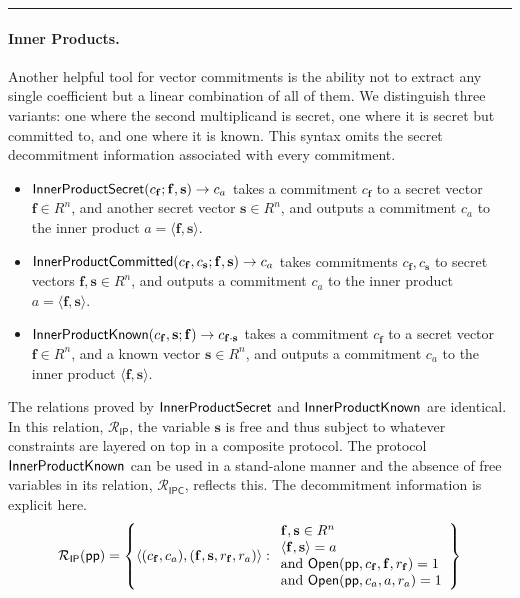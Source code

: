 \documentclass{article}
\theoremstyle{definition}
\begin{document}
\fi 

\noindent\rule{\textwidth}{0.4pt}

\paragraph{Inner Products.} Another helpful tool for vector commitments is the ability not to extract any single coefficient but a linear combination of all of them. We distinguish three variants: one where the second multiplicand is secret, one where it is secret but committed to, and one where it is known. This syntax omits the secret decommitment information associated with every commitment.
\begin{itemize}
    \item $\textsf{{InnerProductSecret}}(c_\mathbf{f}; \mathbf{f}, \mathbf{s}) \rightarrow c_{a}$ takes a commitment $c_\mathbf{f}$ to a secret vector $\mathbf{f} \in R^n$, and another secret vector $\mathbf{s} \in R^n$, and outputs a commitment $c_{a}$ to the inner product $a = \langle \mathbf{f}, \mathbf{s} \rangle$.
    \item $\textsf{{InnerProductCommitted}}(c_\mathbf{f}, c_\mathbf{s}; \mathbf{f}, \mathbf{s}) \rightarrow c_{a}$ takes commitments $c_\mathbf{f}, c_{\mathbf{s}}$ to secret vectors $\mathbf{f}, \mathbf{s} \in R^n$, and outputs a commitment $c_{a}$ to the inner product $a = \langle \mathbf{f}, \mathbf{s} \rangle$.
    \item $\textsf{{InnerProductKnown}}(c_\mathbf{f}, \mathbf{s}; \mathbf{f}) \rightarrow c_{\mathbf{f}\cdot{}\mathbf{s}}$ takes a commitment $c_\mathbf{f}$ to a secret vector $\mathbf{f} \in R^n$, and a known vector $\mathbf{s} \in R^n$, and outputs a commitment $c_{a}$ to the inner product $\langle \mathbf{f}, \mathbf{s} \rangle$.
\end{itemize}
The relations proved by $\textsf{{InnerProductSecret}}$ and $\textsf{{InnerProductKnown}}$ are identical. In this relation, $\mathcal{R}_\mathsf{IP}$, the variable $\mathbf{s}$ is free and thus subject to whatever constraints are layered on top in a composite protocol. The protocol $\textsf{{InnerProductKnown}}$ can be used in a stand-alone manner and the absence of free variables in its relation, $\mathcal{R}_\mathsf{IPC}$, reflects this. The decommitment information is explicit here.
\[ 
\mathcal{R_\textsf{IP}}(\textsf{pp}) = \left\{
\langle (c_\mathbf{f}, c_{a}), (\mathbf{f}, \mathbf{s}, r_\mathbf{f}, r_{a}) \rangle
: 
\begin{array}{l} 
\mathbf{f}, \mathbf{s} \in R^n \ \\
\langle \mathbf{f}, \mathbf{s} \rangle = a \\ 
 \text{and} \ \textsf{{Open}}(\textsf{pp}, c_\mathbf{f}, \mathbf{f}, r_\mathbf{f}) = 1 \\
 \text{and} \ \textsf{{Open}}(\textsf{pp}, c_{a}, a, r_{a}) = 1
\end{array}
\right\}
\] 
\end{document}
